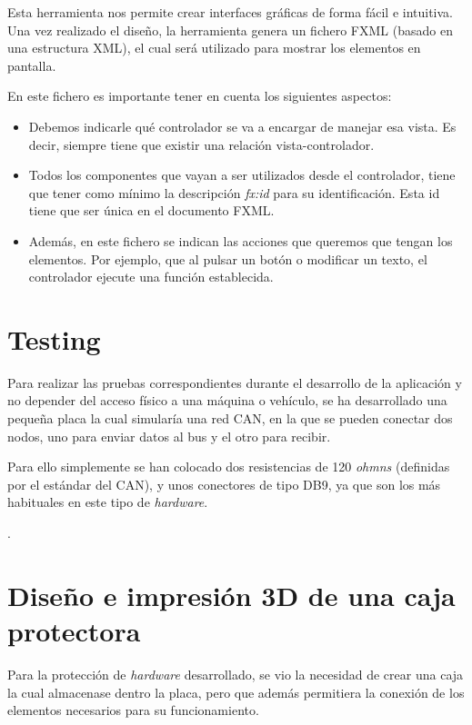 Esta herramienta nos permite crear interfaces gráficas de forma fácil e intuitiva. Una vez realizado el diseño, la herramienta genera un fichero FXML (basado en una estructura XML), el cual será utilizado para mostrar los elementos en pantalla.

En este fichero es importante tener en cuenta los siguientes aspectos:

\begin{itemize}

\item
Debemos indicarle qué controlador se va a encargar de manejar esa vista. Es decir, siempre tiene que existir una relación vista-controlador.
\item
Todos los componentes que vayan a ser utilizados desde el controlador, tiene que tener como mínimo la descripción \emph{fx:id} para su identificación. Esta id tiene que ser única en el documento FXML.
\item
Además, en este fichero se indican las acciones que queremos que tengan los elementos. Por ejemplo, que al pulsar un botón o modificar un texto, el controlador ejecute una función establecida.

\end{itemize}



\section{Testing}\label{testing}

Para realizar las pruebas correspondientes durante el desarrollo de la aplicación y no depender del acceso físico a una máquina o vehículo, se ha desarrollado una pequeña placa la cual simularía una red CAN, en la que se pueden conectar dos nodos, uno para enviar datos al bus y el otro para recibir.

Para ello simplemente se han colocado dos resistencias de 120 \emph{ohmns} (definidas por el estándar del CAN), y unos conectores de tipo DB9, ya que son los más habituales en este tipo de \emph{hardware}.

.

\section{Diseño e impresión 3D de una caja protectora}\label{desarrollo_e_impresion_3d_de_una_caja_protectora}

Para la protección de \emph{hardware} desarrollado, se vio la necesidad de crear una caja la cual almacenase dentro la placa, pero que además permitiera la conexión de los elementos necesarios para su funcionamiento.

